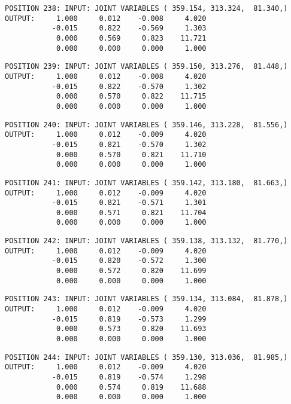 \begin{verbatim}
POSITION 238: INPUT: JOINT VARIABLES ( 359.154, 313.324,  81.340,)
OUTPUT:     1.000     0.012    -0.008     4.020
           -0.015     0.822    -0.569     1.303
            0.000     0.569     0.823    11.721
            0.000     0.000     0.000     1.000
\end{verbatim} \pagebreak[1]\begin{verbatim}
POSITION 239: INPUT: JOINT VARIABLES ( 359.150, 313.276,  81.448,)
OUTPUT:     1.000     0.012    -0.008     4.020
           -0.015     0.822    -0.570     1.302
            0.000     0.570     0.822    11.715
            0.000     0.000     0.000     1.000
\end{verbatim} \pagebreak[1]\begin{verbatim}
POSITION 240: INPUT: JOINT VARIABLES ( 359.146, 313.228,  81.556,)
OUTPUT:     1.000     0.012    -0.009     4.020
           -0.015     0.821    -0.570     1.302
            0.000     0.570     0.821    11.710
            0.000     0.000     0.000     1.000
\end{verbatim} \pagebreak[1]\begin{verbatim}
POSITION 241: INPUT: JOINT VARIABLES ( 359.142, 313.180,  81.663,)
OUTPUT:     1.000     0.012    -0.009     4.020
           -0.015     0.821    -0.571     1.301
            0.000     0.571     0.821    11.704
            0.000     0.000     0.000     1.000
\end{verbatim} \pagebreak[1]\begin{verbatim}
POSITION 242: INPUT: JOINT VARIABLES ( 359.138, 313.132,  81.770,)
OUTPUT:     1.000     0.012    -0.009     4.020
           -0.015     0.820    -0.572     1.300
            0.000     0.572     0.820    11.699
            0.000     0.000     0.000     1.000
\end{verbatim} \pagebreak[1]\begin{verbatim}
POSITION 243: INPUT: JOINT VARIABLES ( 359.134, 313.084,  81.878,)
OUTPUT:     1.000     0.012    -0.009     4.020
           -0.015     0.819    -0.573     1.299
            0.000     0.573     0.820    11.693
            0.000     0.000     0.000     1.000
\end{verbatim} \pagebreak[1]\begin{verbatim}
POSITION 244: INPUT: JOINT VARIABLES ( 359.130, 313.036,  81.985,)
OUTPUT:     1.000     0.012    -0.009     4.020
           -0.015     0.819    -0.574     1.298
            0.000     0.574     0.819    11.688
            0.000     0.000     0.000     1.000
\end{verbatim} \pagebreak[1]\begin{verbatim}

\end{verbatim}

